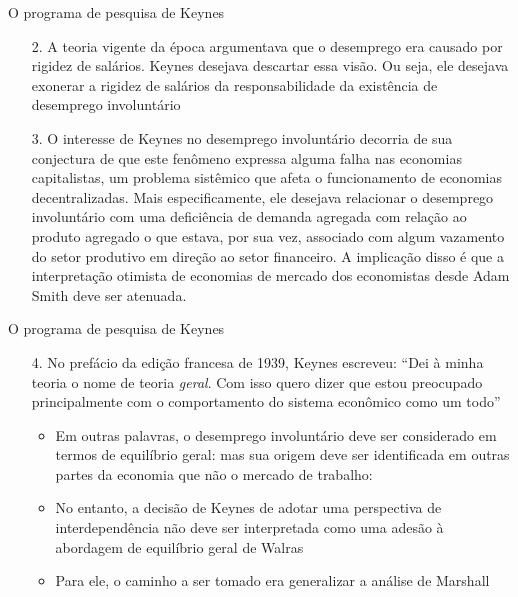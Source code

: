 \documentclass[10pt]{beamer}
\begin{document}
\begin{frame}{O programa de pesquisa de Keynes}
  \begin{enumerate}    
  \item[2.] A teoria vigente da época argumentava que o desemprego era causado por rigidez de salários. Keynes desejava descartar essa visão. Ou seja, ele desejava exonerar a rigidez de salários da responsabilidade da existência de desemprego involuntário\bigskip
  
  \item[3.] O interesse de Keynes no desemprego involuntário decorria de sua conjectura de que este fenômeno expressa alguma falha nas economias capitalistas, um problema sistêmico que afeta o funcionamento de economias decentralizadas. Mais especificamente, ele desejava relacionar o desemprego involuntário com uma deficiência de demanda agregada com relação ao produto agregado o que estava, por sua vez, associado com algum vazamento do setor produtivo em direção ao setor financeiro. A implicação disso é que a interpretação otimista de economias de mercado dos economistas desde Adam Smith deve ser atenuada.
  \end{enumerate}
\end{frame}

\begin{frame}{O programa de pesquisa de Keynes}
    \begin{enumerate}    
        \item[4.] No prefácio da edição francesa de 1939, Keynes escreveu: ``Dei à minha teoria o nome de teoria \emph{geral}. Com isso quero dizer que estou preocupado principalmente com o comportamento do sistema econômico como um todo''\bigskip
        \begin{itemize}
            \item Em outras palavras, o desemprego involuntário deve ser considerado em termos de equilíbrio geral: mas sua origem deve ser identificada em outras partes da economia que não o mercado de trabalho:\medskip
            \medskip
            \item No entanto, a decisão de Keynes de adotar uma perspectiva de interdependência não deve ser interpretada como uma adesão à abordagem de equilíbrio geral de Walras\medskip
            \item Para ele, o caminho a ser tomado era generalizar a análise de Marshall
        \end{itemize}        
    \end{enumerate}
\end{frame}
\end{document}
